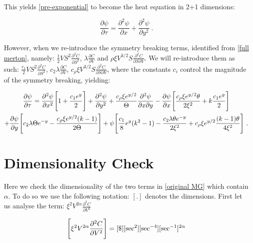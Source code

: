 \documentclass[english,12pt]{article}
\begin{document}
This yields \ref{pre-exponential} to become the heat equation in 2+1 dimensions:


\begin{equation}
\frac{\partial \psi}{\partial \tau} = \frac{\partial^2 \psi}{\partial x} + \frac{\partial^2 \psi}{\partial y^2}~.
\end{equation}





However, when we re-introduce the symmetry breaking terms, identified from \ref{full merton}, namely: $\frac{1}{2} V S^2 \frac{\partial^2 C}{\partial S^2}$,  $\lambda \frac{\partial C}{\partial V} $ and $\rho \xi V^{3/2} S \frac{\partial^2 C}{\partial S \partial V} $. We will re-introduce them as such:  $\frac{c_1}{2} V S^2 \frac{\partial^2 C}{\partial S^2}$, $c_2 \lambda \frac{\partial C}{\partial V}$, $c_{\rho} \xi V^{3/2} S \frac{\partial^2 C}{\partial S \partial V} $, where the constants $c_{i}$ control the magnitude of the symmetry breaking, yielding:

\begin{multline}
\frac{\partial \psi}{\partial \tau} = \frac{\partial^2 \psi}{\partial x^{2}}\Bigg{[}  1 +  \frac{c_{1}e^{y}}{2}  \Bigg{]} + \frac{\partial^2 \psi}{\partial y^2} + \frac{c_{\rho}\xi e^{y/2}}{\Theta}\frac{\partial^{2}\psi}{\partial x\partial y} - \frac{\partial \psi}{\partial x} \Bigg{[}\frac{ c_{\rho}\xi e^{y/2} \theta}{2\xi^{2}}  + k \frac{c_{1}e^{y}}{2}    \Bigg{]} \\ + \frac{\partial\psi}{\partial y} \Bigg{[}c_{2}\lambda\Theta e^{-y}   - \frac{c_{\rho}\xi e^{y/2}(k-1)}{2\Theta}   \Bigg{]}    + \psi \Bigg{[} \frac{c_{1}}{8}e^{y}(k^{2} - 1) - \frac{c_{2}\lambda\theta e^{-y}}{2\xi^{2}} +  c_{\rho}\xi e^{y/2}\frac{(k - 1)\theta}{4\xi^{2}}  \Bigg{]}~.
\end{multline}



\vskip15mm
\section{Dimensionality Check}
\vskip5mm

Here we check the dimensionality of the two terms in \ref{original MG} which contain $\alpha$. To do so we use the following notation: $[.]$ denotes the dimensions. First let us analyse the term: $\xi^2 V^{2 \alpha}  \frac{\partial^2 C}{\partial V^2}$

\begin{equation}
\Bigg{[} \xi^2 V^{2 \alpha}  \frac{\partial^2 C}{\partial V^2} \Bigg{]} = [\$] [\text{sec}^{2}][\text{sec}^{-4}][\text{sec}^{-1}]^{2\alpha}
\end{equation}
\end{document}
